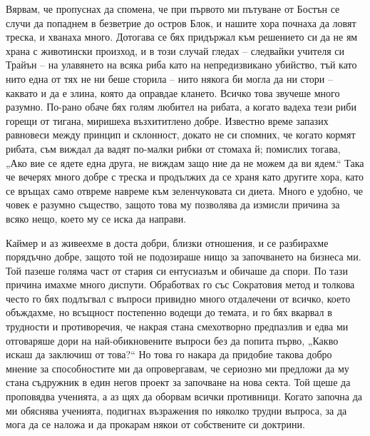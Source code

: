 \documentclass[12pt]{book}
\begin{document}
Вярвам, че пропуснах да спомена, че при първото ми пътуване от Бостън се случи да попаднем в безветрие до остров Блок, и нашите хора почнаха да ловят треска, и хванаха много. Дотогава се бях придържал към решението си да не ям храна с животински произход, и в този случай гледах – следвайки учителя си Трайън – на улавянето на всяка риба като на непредизвикано убийство, тъй като нито една от тях не ни беше сторила – нито някога би могла да ни стори – каквато и да е злина, която да оправдае клането. Всичко това звучеше много разумно. По-рано обаче бях голям любител на рибата, а когато вадеха тези риби горещи от тигана, миришеха възхититлено добре. Известно време запазих равновеси между принцип и склонност, докато не си спомних, че когато кормят рибата, съм виждал да вадят по-малки рибки от стомаха й; помислих тогава, „Ако вие се ядете една друга, не виждам защо ние да не можем да ви ядем.“ Така че вечерях много добре с треска и продължих да се храня като другите хора, като се връщах само отвреме навреме към зеленчуковата си диета. Много е удобно, че човек е разумно същество, защото това му позволява да измисли причина за всяко нещо, което му се иска да направи.

Каймер и аз живеехме в доста добри, близки отношения, и се разбирахме порядъчно добре, защото той не подозираше нищо за започването на бизнеса ми. Той пазеше голяма част от стария си ентусиазъм и обичаше да спори. По тази причина имахме много диспути. Обработвах го със Сократовия метод и толкова често го бях подлъгвал с въпроси привидно много отдалечени от всичко, което объждахме, но всъщност постепенно водещи до темата, и го бях вкарвал в трудности и противоречия, че накрая стана смехотворно предпазлив и едва ми отговаряше дори на най-обикновените въпроси без да попита първо, „Какво искаш да заключиш от това?“ Но това го накара да придобие такова добро мнение за способностите ми да опровергавам, че сериозно ми предложи да му стана съдружник в един негов проект за започване на нова секта. Той щеше да проповядва ученията, а аз щях да оборвам всички противници. Когато започна да ми обяснява ученията, подигнах възражения по няколко трудни въпроса, за да мога да се наложа и да прокарам някои от собствените си доктрини.
\end{document}
